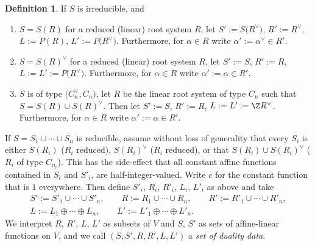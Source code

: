 \documentclass[pdftex]{sigma}
\theoremstyle{definition}
\newtheorem{Definition}[Theorem]{Definition}
\numberwithin{equation}{section}
\begin{document}
\begin{Definition}
 If $S$ is irreducible, and
 \begin{enumerate}\itemsep=0pt
 \item[(i)] $S=S(R)$ for a reduced (linear) root system $R$, let
$
 S':= S\bigl(R^\vee\bigr)$, $ R':= R^\vee$, $ L:= P(R)$, $ L':= P\bigl(R^\vee\bigr)$.
 Furthermore, for $\alpha\in R$ write
 $\alpha':=\alpha^\vee\in R'$.
 \item[(ii)] $S=S(R)^\vee$ for a reduced (linear) root system $R$, let
$
 S':= S$, $ R':= R$, $ L:=L':=P\bigl(R^\vee\bigr)$.
 Furthermore, for $\alpha\in R$ write
 $\alpha':=\alpha\in R'$.
 \item[(iii)] $S$ is of type $\bigl(C_n^\vee, C_n\bigr)$, let $R$ be the linear root system of
 type $C_n$ such that $S=S(R)\cup S(R)^\vee$. Then let
$
 S':= S$, $ R':= R$, $ L:=L':= \Z R^\vee$.
 Furthermore, for $\alpha\in R$ write
 $\alpha':=\alpha\in R'$.
 \end{enumerate}
 If $S=S_1\cup\cdots\cup S_n$ is reducible, assume without loss of generality that
 every $S_i$ is either $S(R_i)$ ($R_i$ reduced), $S(R_i)^\vee$ ($R_i$ reduced), or
 that $S(R_i)\cup S(R_i)^\vee$ ($R_i$ of type $C_{n_i}$). This has the side-effect that all
 constant affine functions contained in $S_i$ and $S'_i$, are half-integer-valued. Write
 $c$ for the constant function that is $1$ everywhere.
 Then define $S'_i$, $R_i$, $R'_i$, $L_i$, $L'_i$ as above and take
 \begin{gather*}
 S':= S'_1\cup\cdots\cup S'_n,\qquad
 R:= R_1\cup\cdots\cup R_n,\qquad
 R':= R'_1\cup\cdots\cup R'_n,\\
 L:= L_1\oplus\cdots\oplus L_n,\qquad
 L':= L'_1\oplus\cdots\oplus L'_n.
 \end{gather*}
 We interpret $R$, $R'$, $L$, $L'$ as subsets of $V$ and $S$, $S'$ as sets of
 affine-linear functions on $V$, and we call
 $(S,S',R,R',L,L')$ a \emph{set of duality data}.
\end{Definition}
\end{document}
